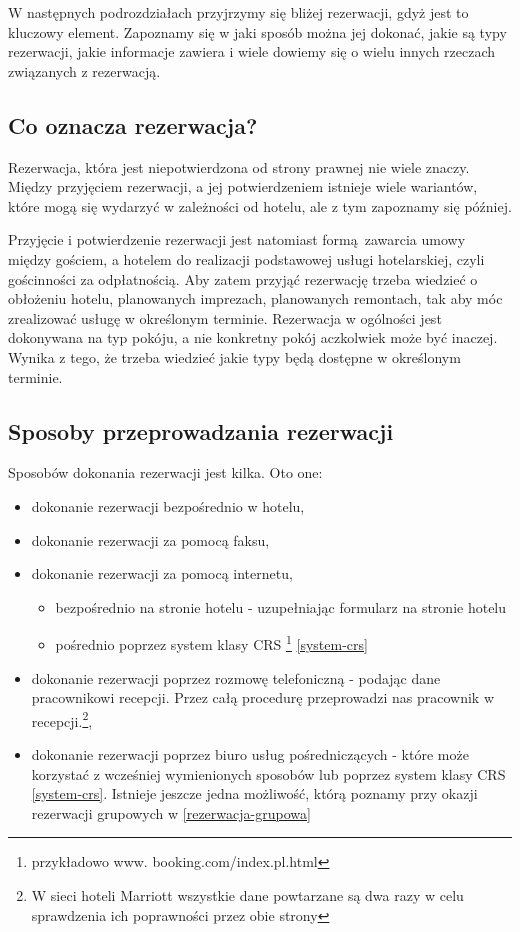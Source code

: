 \documentclass[a4paper,onecolumn,oneside,11pt,wide,floatssmall]{mwrep}
\theoremstyle{definition}
\theoremstyle{plain}%
\theoremstyle{remark}
\begin{document}
W następnych podrozdziałach przyjrzymy się bliżej rezerwacji, gdyż jest to 
kluczowy element. Zapoznamy się w jaki sposób można jej dokonać, jakie są 
typy rezerwacji, jakie informacje zawiera i wiele dowiemy się o wielu innych 
rzeczach związanych z rezerwacją.

\subsection{Co oznacza rezerwacja?}
Rezerwacja, która jest niepotwierdzona od strony prawnej nie wiele znaczy. 
Między przyjęciem rezerwacji, a jej potwierdzeniem istnieje wiele wariantów, 
które mogą się wydarzyć w zależności od hotelu, ale z tym zapoznamy się 
później. 

Przyjęcie i potwierdzenie rezerwacji jest natomiast formą zawarcia umowy 
między gościem, a hotelem do realizacji podstawowej usługi hotelarskiej, 
czyli gościnności za odpłatnością. Aby zatem przyjąć rezerwację trzeba 
wiedzieć o obłożeniu hotelu, planowanych imprezach, planowanych remontach, 
tak aby móc zrealizować usługę w określonym terminie. Rezerwacja w ogólności 
jest dokonywana na typ pokóju, a nie konkretny pokój aczkolwiek może być 
inaczej. Wynika z tego, że trzeba wiedzieć jakie typy będą dostępne w 
określonym terminie.

\subsection{Sposoby przeprowadzania rezerwacji}
Sposobów dokonania rezerwacji jest kilka. Oto one:
\begin{itemize}
  \item dokonanie rezerwacji bezpośrednio w hotelu,
  \item dokonanie rezerwacji za pomocą faksu,
  \item dokonanie rezerwacji za pomocą internetu,
  \begin{itemize}
     \item bezpośrednio na stronie hotelu - uzupełniając formularz na 
     stronie hotelu
     \item pośrednio poprzez system klasy CRS \footnote{przykładowo www.
     booking.com/index.pl.html} \ref{system-crs}
  \end{itemize}
  \item dokonanie rezerwacji poprzez rozmowę telefoniczną - podając dane 
  pracownikowi recepcji. Przez całą procedurę przeprowadzi nas pracownik w 
  recepcji.\footnote{W sieci hoteli Marriott wszystkie dane powtarzane są 
  dwa razy w celu sprawdzenia ich poprawności przez obie strony},
  \item dokonanie rezerwacji poprzez biuro usług pośredniczących - które  
  może korzystać z wcześniej wymienionych sposobów lub poprzez system klasy 
  CRS \ref{system-crs}. Istnieje jeszcze jedna możliwość, którą poznamy przy 
  okazji rezerwacji grupowych w \ref{rezerwacja-grupowa}
\end{itemize}
\end{document}
